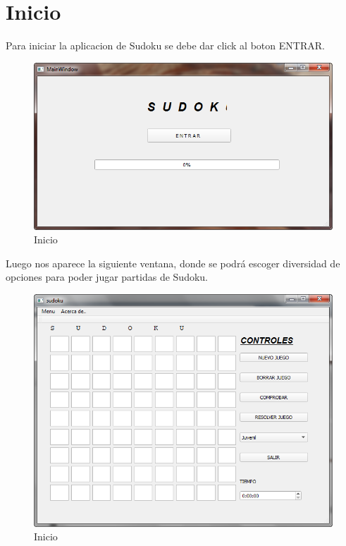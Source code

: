 \section{Inicio}

Para iniciar la aplicacion de Sudoku se debe dar click al boton ENTRAR.

\begin{figure}[htbp]
\begin{center}
\includegraphics[width=.60\textwidth]{./imagenes/Inicio.png}
\caption{Inicio}
\label{Inicio}
\end{center}
\end{figure}

Luego nos aparece la siguiente ventana, donde se podrá escoger diversidad de opciones para poder jugar partidas de Sudoku.

\begin{figure}[htbp]
\begin{center}
\includegraphics[width=.60\textwidth]{./imagenes/Menu.png}
\caption{Inicio}
\label{Inicio}
\end{center}
\end{figure}

 
